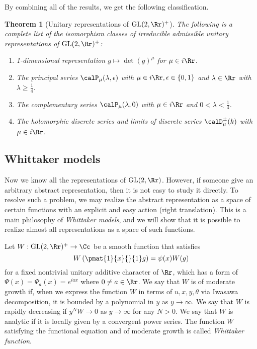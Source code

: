 \documentclass{article}
\newtheorem{theorem}{Theorem}[section]
\newcommand{\GL}{\mathrm{GL}}
\begin{document}
By combining all of the results, we get the following classification. 

\begin{theorem}[Unitary representations of $\GL(2, \Rr)^{+}$]
The following is a complete list of the isomorphism classes of irreducible admissible unitary representations of $\GL(2, \Rr)^{+}$:
\begin{enumerate}
\item 1-dimensional representation $g\mapsto \det(g)^{\mu}$ for $\mu\in i\Rr$. 
\item The principal series $\calP_{\mu}(\lambda, \epsilon)$ with $\mu\in i\Rr, \epsilon \in \{0, 1\}$ and $\lambda\in \Rr$ with $\lambda \geq \frac{1}{4}$. 
\item The complementary series $\calP_{\mu}(\lambda, 0)$ with $\mu\in i\Rr$ and $0<\lambda <\frac{1}{4}$. 
\item The holomorphic discrete series and limits of discrete series $\calD_{\mu}^{\pm}(k)$ with $\mu\in i\Rr$. 
\end{enumerate}
\end{theorem}


\subsection{Whittaker models}
Now we know all the representations of $\GL(2, \Rr)$. However, if someone give an arbitrary abstract representation, then it is not easy to study it directly. To resolve such a problem, we may realize the abstract representation as a space of certain functions with an explicit and easy action (right translation). 
This is a main philosophy of \emph{Whittaker models}, and we will show that it is possible to realize almost all representations as a space of such functions. 

Let $W:\GL(2, \Rr)^{+}\to \Cc$ be a smooth function that satisfies 
$$
W\left(\pmat{1}{x}{}{1}g \right) = \psi(x) W(g)
$$
for a fixed nontrivial unitary additive character of $\Rr$, which has a form of $\Psi(x) = \Psi_{a}(x) = e^{iax}$ where  $0\neq a\in\Rr$. We say that $W$ is of moderate growth if, when we express the function $W$ in terms of $u, x, y, \theta$ via Iwasawa decomposition, it is bounded by a polynomial in $y$ as $y\to \infty$. We say that $W$ is rapidly decreasing if $y^{N}W\to 0$ as $y\to \infty$ for any $N>0$. We say that $W$ is analytic if it is locally given by a convergent power series. 
The function $W$ satisfying the functional equation and of moderate growth is called \emph{Whittaker function}.
\end{document}
